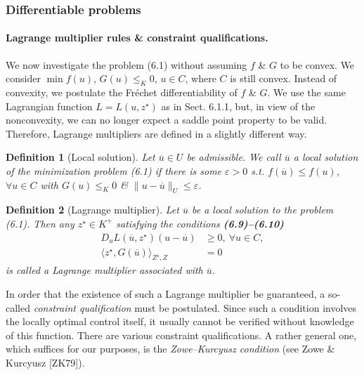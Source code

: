 \documentclass[oneside]{book}
\numberwithin{equation}{section}
\newtheorem{definition}{Definition}[chapter]
\begin{document}
\subsubsection{Differentiable problems}

\paragraph{Lagrange multiplier rules \& constraint qualifications.} We now investigate the problem (6.1) without assuming $f$ \& $G$ to be convex. We consider $\min f(u)$, $G(u)\le_K 0$, $u\in C$, where $C$ is still convex. Instead of convexity, we postulate the Fr\'echet differentiability of $f$ \& $G$. We use the same Lagrangian function $L = L(u,z^\star)$ as in Sect. 6.1.1, but, in view of the nonconvexity, we can no longer expect a saddle point property to be valid. Therefore, Lagrange multipliers are defined in a slightly different way.

\begin{definition}[Local solution]
	Let $\overline{u}\in U$ be admissible. We call $\overline{u}$ a \emph{local solution} of the minimization problem (6.1) if there is some $\varepsilon > 0$ s.t. $f(\overline{u})\le f(u)$, $\forall u\in C$ with $G(u)\le_K 0$ \& $\|u - \overline{u}\|_U\le\varepsilon$.
\end{definition}

\begin{definition}[Lagrange multiplier]
	Let $\overline{u}$ be a local solution to the problem (6.1). Then any $z^\star\in K^+$ satisfying the conditions \textbf{(6.9)--(6.10)}
	\begin{align*}
		D_uL(\overline{u},z^\star)(u - \overline{u})&\ge 0,\ \forall u\in C,\\
		\langle z^\star,G(\overline{u})\rangle_{Z^\star,Z} &= 0
	\end{align*}
	is called a \emph{Lagrange multiplier} associated with $\overline{u}$.
\end{definition}
In order that the existence of such a Lagrange multiplier be guaranteed, a so-called \textit{constraint qualification} must be postulated. Since such a condition involves the locally optimal control itself, it usually cannot be verified without knowledge of this function. There are various constraint qualifications. A rather general one, which suffices for our purposes, is the \textit{Zowe--Kurcyusz condition} (see Zowe \& Kurcyusz [ZK79]).
\end{document}
